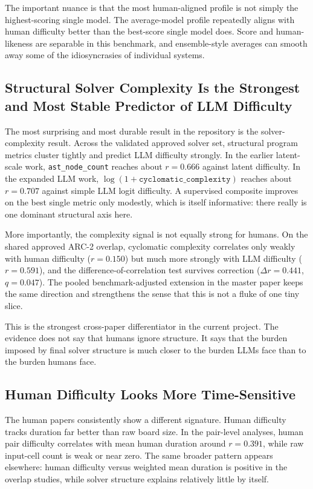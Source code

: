 \documentclass[11pt,letterpaper]{article}
\begin{document}
The important nuance is that the most human-aligned profile is not simply the highest-scoring single model. The average-model profile repeatedly aligns with human difficulty better than the best-score single model does. Score and human-likeness are separable in this benchmark, and ensemble-style averages can smooth away some of the idiosyncrasies of individual systems.

\subsection{Structural Solver Complexity Is the Strongest and Most Stable Predictor of LLM Difficulty}

The most surprising and most durable result in the repository is the solver-complexity result. Across the validated approved solver set, structural program metrics cluster tightly and predict LLM difficulty strongly. In the earlier latent-scale work, \texttt{ast\_node\_count} reaches about $r = 0.666$ against latent difficulty. In the expanded LLM work, $\log(1 + \texttt{cyclomatic\_complexity})$ reaches about $r = 0.707$ against simple LLM logit difficulty. A supervised composite improves on the best single metric only modestly, which is itself informative: there really is one dominant structural axis here.

More importantly, the complexity signal is not equally strong for humans. On the shared approved ARC-2 overlap, cyclomatic complexity correlates only weakly with human difficulty ($r = 0.150$) but much more strongly with LLM difficulty ($r = 0.591$), and the difference-of-correlation test survives correction ($\Delta r = 0.441$, $q = 0.047$). The pooled benchmark-adjusted extension in the master paper keeps the same direction and strengthens the sense that this is not a fluke of one tiny slice.

This is the strongest cross-paper differentiator in the current project. The evidence does not say that humans ignore structure. It says that the burden imposed by final solver structure is much closer to the burden LLMs face than to the burden humans face.

\subsection{Human Difficulty Looks More Time-Sensitive}

The human papers consistently show a different signature. Human difficulty tracks duration far better than raw board size. In the pair-level analyses, human pair difficulty correlates with mean human duration around $r = 0.391$, while raw input-cell count is weak or near zero. The same broader pattern appears elsewhere: human difficulty versus weighted mean duration is positive in the overlap studies, while solver structure explains relatively little by itself.
\end{document}
